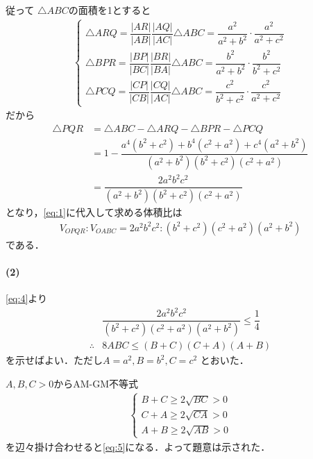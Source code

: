 \documentclass[../../main.tex]{subfiles}
\begin{document}
従って $\triangle ABC$の面積を1とすると
\begin{align}
  \begin{cases}
    \triangle ARQ = \dfrac{|AR|}{|AB|}\dfrac{|AQ|}{|AC|}\triangle ABC
    = \dfrac{a^2}{a^2+b^2} \cdot \dfrac{a^2}{a^2+c^2} \\
    \triangle BPR =  \dfrac{|BP|}{|BC|}\dfrac{|BR|}{|BA|}\triangle ABC
    = \dfrac{b^2}{a^2+b^2} \cdot \dfrac{b^2}{b^2+c^2} \\
    \triangle PCQ = \dfrac{|CP|}{|CB|}\dfrac{|CQ|}{|AC|}\triangle ABC
    = \dfrac{c^2}{b^2+c^2} \cdot \dfrac{c^2}{a^2+c^2}
  \end{cases}
\end{align}
だから
\begin{align}
  \triangle PQR
  &= \triangle ABC - \triangle ARQ - \triangle BPR - \triangle PCQ \\
  &= 1 - \dfrac{a^4(b^2+c^2) + b^4(c^2+a^2) + c^4(a^2+b^2)}{(a^2+b^2)(b^2+c^2)(c^2+a^2)} \\
  &= \dfrac{2a^2b^2c^2}{(a^2+b^2)(b^2+c^2)(c^2+a^2)}
\end{align}
となり，\cref{eq:1}に代入して求める体積比は
\begin{align}
  V_{OPQR} : V_{OABC} = 2a^2b^2c^2 : (b^2+c^2)(c^2+a^2)(a^2+b^2) \label{eq:4}
\end{align}
である．

\paragraph{(2)}

\cref{eq:4}より
\begin{align}
  & \dfrac{2a^2b^2c^2}{(b^2+c^2)(c^2+a^2)(a^2+b^2)} \le \dfrac{1}{4} \\
  \therefore
  & 8ABC \le (B+C)(C+A)(A+B) \label{eq:5}
\end{align}
を示せばよい．ただし$A=a^2, B=b^2, C=c^2$ とおいた．

$A,B,C >0$からAM-GM不等式
\begin{align}
  \begin{cases}
    B+C \ge 2\sqrt{BC} > 0 \\
    C+A \ge 2\sqrt{CA} > 0 \\
    A+B \ge 2\sqrt{AB} > 0
  \end{cases}
\end{align}
を辺々掛け合わせると\cref{eq:5}になる．よって題意は示された．
\end{document}
